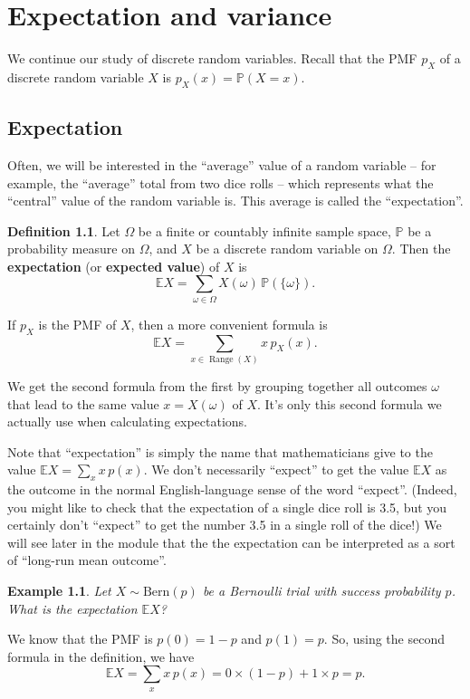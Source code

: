 \documentclass[
  a4paper,
]{book}
\theoremstyle{definition}
\newtheorem{definition}{Definition}[chapter]
\theoremstyle{definition}
\newtheorem{example}{Example}[chapter]
\theoremstyle{definition}
\theoremstyle{definition}
\theoremstyle{remark}
\begin{document}
\hypertarget{L10-expectation}{%
\chapter{Expectation and variance}\label{L10-expectation}}

We continue our study of discrete random variables. Recall that the PMF \(p_X\) of a discrete random variable \(X\) is \(p_X(x) = \mathbb P(X = x)\).

\hypertarget{expectation}{%
\section{Expectation}\label{expectation}}

Often, we will be interested in the ``average'' value of a random variable -- for example, the ``average'' total from two dice rolls -- which represents what the ``central'' value of the random variable is. This average is called the ``expectation''.

\begin{definition}
Let \(\Omega\) be a finite or countably infinite sample space, \(\mathbb P\) be a probability measure on \(\Omega\), and \(X\) be a discrete random variable on \(\Omega\). Then the \textbf{expectation} (or \textbf{expected value}) of \(X\) is
\[ \mathbb EX = \sum_{\omega \in \Omega} X(\omega) \, \mathbb P(\{\omega\}) . \]

If \(p_X\) is the PMF of \(X\), then a more convenient formula is
\[ \mathbb EX = \sum_{x \in \operatorname{Range}(X)} x\,p_X(x) . \]
\end{definition}

We get the second formula from the first by grouping together all outcomes \(\omega\) that lead to the same value \(x = X(\omega)\) of \(X\). It's only this second formula we actually use when calculating expectations.

Note that ``expectation'' is simply the name that mathematicians give to the value \(\mathbb EX = \sum_x x\, p(x)\). We don't necessarily ``expect'' to get the value \(\mathbb EX\) as the outcome in the normal English-language sense of the word ``expect''. (Indeed, you might like to check that the expectation of a single dice roll is 3.5, but you certainly don't ``expect'' to get the number 3.5 in a single roll of the dice!) We will see later in the module that the the expectation can be interpreted as a sort of ``long-run mean outcome''.

\begin{example}
\emph{Let \(X \sim \text{Bern}(p)\) be a Bernoulli trial with success probability \(p\). What is the expectation \(\mathbb EX\)?}

We know that the PMF is \(p(0) = 1- p\) and \(p(1) = p\). So, using the second formula in the definition, we have
\[ \mathbb EX = \sum_{x} x\,p(x) = 0\times (1-p) + 1\times p = p. \]
\end{example}
\end{document}
